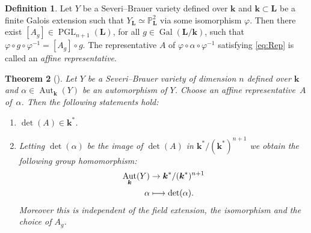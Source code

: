 \documentclass[JEP,XML,SOM,Unicode,NoFloatCountersInSection, NoEqCountersInSection,published]{cedram}
\newcommand\mto{\mathchoice{\longmapsto}{\mapsto}{\mapsto}{\mapsto}}
\DeclareMathOperator{\Gal}{Gal}
\newtheorem{theorem}{Theorem}[section]
\theoremstyle{definition}
\newtheorem{definition}[theorem]{Definition}
\newcommand{\kk}{{\boldsymbol{k}}}
\newcommand{\LL}{{\boldsymbol{L}}}
\DeclareMathOperator{\PGL}{PGL}
\DeclareMathOperator{\Aut}{Aut}
\begin{document}
\begin{definition}
Let $Y$ be a Severi--Brauer variety defined over $\kk$ and $\kk \subset \LL$ be a finite Galois extension such that $Y_{\LL} \simeq \mathbb{P}^2_{\LL}$ via some isomorphism $\varphi$. Then there exist $[A_g] \in \PGL_{n + 1}(\LL)$, for all $ g \in \Gal(\LL/\kk)$, such that $\varphi \circ g \circ \varphi^{-1} = [A_g] \circ g$. The representative $A$ of $\varphi \circ \alpha \circ \varphi^{-1}$ satisfying \eqref{eq:Rep} is called an \emph{affine representative}.
\end{definition}

\begin{theorem}[\cite{BSYUnp}] \label{Determinant}
Let $Y$ be a Severi--Brauer variety of dimension $n$ defined over $\kk$ and $\alpha \in \Aut_{\kk}(Y)$ be an automorphism of $Y$. Choose an affine representative~$A$ of~$\alpha$. Then the following statements hold:
\begin{enumerate}
\item $\det(A) \in \kk^*$.
\item Letting $\det(\alpha)$ be the image of $\det(A)$ in $\kk^* / (\kk^*)^{n + 1}$ we obtain the following group homomorphism:
\begin{align*}
\Aut_{\kk}(Y) &\to \kk^*/(\kk^*)^{n + 1}
\\
\alpha &\mto \det(\alpha).
\end{align*}
Moreover this is independent of the field extension, the isomorphism and the choice of $A_g$.
\end{enumerate}
\end{theorem}
\end{document}
